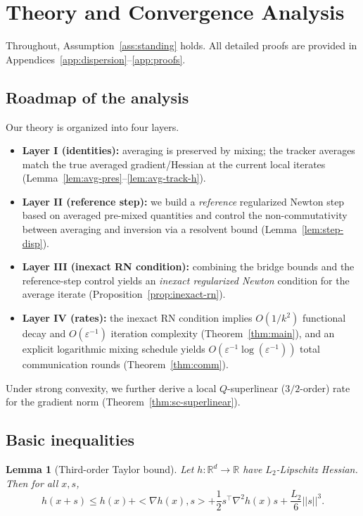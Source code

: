 \documentclass[11pt,a4paper]{article}
\def\cO{O}%
\def\norm#1{||#1||}%
\def\ip#1#2{<#1,#2>}%
\newtheorem{lemma}[theorem]{Lemma}
\newcommand{\R}{\mathbb{R}}
\newcommand{\ip}[2]{\left\langle #1,#2\right\rangle}
\newcommand{\norm}[1]{\left\|#1\right\|}
\newcommand{\cO}{\mathcal{O}}
\begin{document}
\section{Theory and Convergence Analysis}\label{sec:theory}
Throughout, Assumption~\ref{ass:standing} holds.
All detailed proofs are provided in Appendices~\ref{app:dispersion}--\ref{app:proofs}.

\subsection{Roadmap of the analysis}\label{ssec:roadmap}
Our theory is organized into four layers.
\begin{itemize}[leftmargin=1.2em,itemsep=2pt]
	\item \textbf{Layer I (identities):} averaging is preserved by mixing; the tracker averages match the true averaged gradient/Hessian at the current local iterates (Lemma~\ref{lem:avg-pres}--\ref{lem:avg-track-h}).
	\item \textbf{Layer II (reference step):} we build a \emph{reference} regularized Newton step based on averaged pre-mixed quantities and control the non-commutativity between averaging and inversion via a resolvent bound (Lemma~\ref{lem:step-disp}).
	\item \textbf{Layer III (inexact RN condition):} combining the bridge bounds and the reference-step control yields an \emph{inexact regularized Newton} condition for the average iterate (Proposition~\ref{prop:inexact-rn}).
	\item \textbf{Layer IV (rates):} the inexact RN condition implies $\cO(1/k^2)$ functional decay and $\cO(\varepsilon^{-1})$ iteration complexity (Theorem~\ref{thm:main}), and an explicit logarithmic mixing schedule yields $\cO(\varepsilon^{-1}\log(\varepsilon^{-1}))$ total communication rounds (Theorem~\ref{thm:comm}).
\end{itemize}
Under strong convexity, we further derive a local $Q$-superlinear ($3/2$-order) rate for the gradient norm (Theorem~\ref{thm:sc-superlinear}).

\subsection{Basic inequalities}
\begin{lemma}[Third-order Taylor bound]\label{lem:taylor3}
	Let $h:\R^d\to\R$ have $L_2$-Lipschitz Hessian. Then for all $x,s$,
	\[
	h(x+s)\le h(x)+\ip{\nabla h(x)}{s}+\frac12 s^\top\nabla^2 h(x)s+\frac{L_2}{6}\norm{s}^3.
	\]
\end{lemma}
\end{document}
